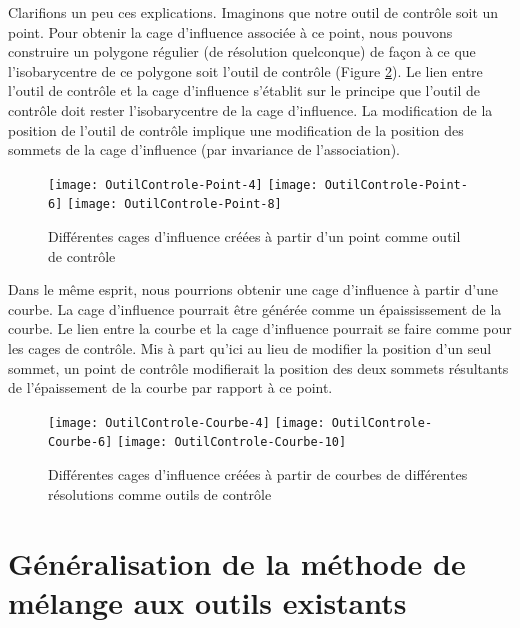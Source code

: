 Clarifions un peu ces explications. Imaginons que notre outil de contrôle soit
un point. Pour obtenir la cage d'influence associée à ce point, nous pouvons
construire un polygone régulier (de résolution quelconque) de façon à ce que
l'isobarycentre de ce polygone soit l'outil de contrôle (Figure \ref{EXTPoi}).
Le lien entre l'outil de contrôle et la cage d'influence s'établit sur le
principe que l'outil de contrôle doit rester l'isobarycentre de la cage
d'influence. La modification de la position de l'outil de contrôle implique une
modification de la position des sommets de la cage d'influence (par
invariance de l'association).

\begin{figure}[ht]
\begin{center}
  \texttt{[image: OutilControle-Point-4]}
  \texttt{[image: OutilControle-Point-6]}
  \texttt{[image: OutilControle-Point-8]}

  \caption[Cages d'influence à partir d'un point] {Différentes cages
d'influence créées à partir d'un point comme outil de contrôle}
  \label{EXTPoi}

\end{center}
\end{figure}

Dans le même esprit, nous pourrions obtenir une cage d'influence à partir
d'une courbe. La cage d'influence pourrait être générée comme un
épaississement de la courbe. Le lien entre la courbe et la cage d'influence
pourrait se faire comme pour les cages de contrôle. Mis à part qu'ici au lieu
de modifier la position d'un seul sommet, un point de contrôle modifierait la
position des deux sommets résultants de l'épaissement de la courbe par rapport
à ce point.

\begin{figure}[ht]
\begin{center}
  \texttt{[image: OutilControle-Courbe-4]}
  \texttt{[image: OutilControle-Courbe-6]}
  \texttt{[image: OutilControle-Courbe-10]}

  \caption[Cages d'influence à partir d'une courbe] {Différentes cages
d'influence créées à partir de courbes de différentes résolutions comme outils
de contrôle}

  \label{EXTPoi}

\end{center}
\end{figure}

\section{Généralisation de la méthode de mélange aux outils existants}

